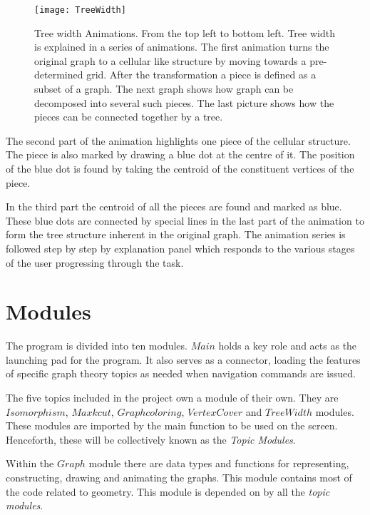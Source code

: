 \begin{figure}[ht]
\centering
\texttt{[image: TreeWidth]}
\caption{
        Tree width Animations. From the top left to bottom left. Tree width is
        explained in a series of animations. The first animation turns the
        original graph to a cellular like structure by moving towards a
        pre-determined grid.  After the transformation a piece is defined as a
        subset of a graph.  The next graph shows how graph can be decomposed
        into several such pieces.  The last picture shows how the pieces can be
        connected together by a tree.
        }
\label{animationfigure: vertexCover}
\end{figure}

The second part of the animation highlights one piece of the cellular structure. The piece is also marked by drawing a blue dot at the centre
of it. The position of the blue dot is found by taking the centroid of the
constituent vertices of the piece.

In the third part the centroid of all the pieces are found and marked as blue.
These blue dots are connected by special lines in the last part of the
animation to form the tree structure inherent in the original graph. The animation series is followed step by step by explanation panel which responds
to the various stages of the user progressing through the task.


\section{Modules}

The program is divided into ten modules.  $Main$ holds a key role and acts as the launching pad for the program. It also serves as a connector, loading the features of specific graph theory topics as needed when navigation commands are issued.

The five topics included in the project own a module of their own. They are
$Isomorphism$, $Maxkcut$, $Graphcoloring$, $VertexCover$ and $TreeWidth$ modules.
These modules are imported by the main function to be used on the screen.
Henceforth, these will be collectively known as the \emph{Topic Modules}.

Within the $Graph$ module there are data types and functions for representing,
constructing, drawing and animating the graphs. This module contains most of the
code related to geometry. This module is depended on by all the \emph{topic modules}.

